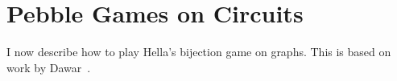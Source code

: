 \documentclass[../main/thesis.tex]{subfiles}
\begin{document}
\section{Pebble Games on Circuits}

I now describe how to play Hella's bijection game on graphs. This is based on work by Dawar~\cite{}. 
\end{document}
